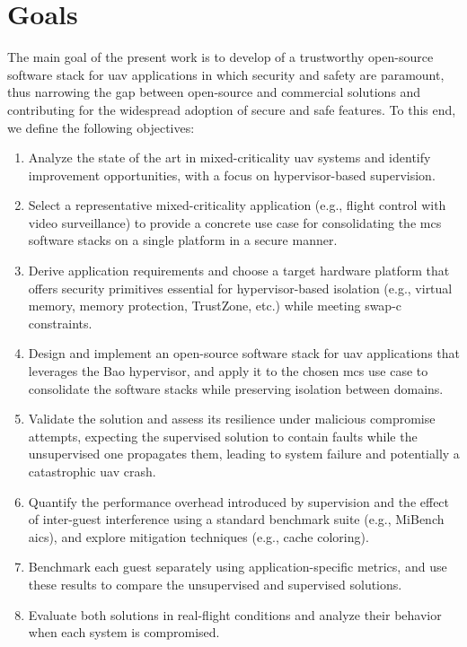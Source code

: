 \section{Goals}
The main goal of the present work is to develop of a trustworthy
open-source software stack for \gls{uav} applications in which security and
safety are paramount, thus narrowing the gap between open-source and commercial
solutions and contributing for the widespread adoption of secure and safe features.
%
To this end, we define the following objectives:
\begin{enumerate}
\item Analyze the state of the art in mixed-criticality \gls{uav} systems and
  identify improvement opportunities, with a focus on hypervisor-based
  supervision.
\item Select a representative mixed-criticality application (e.g., flight
  control with video surveillance) to provide a concrete use case for
  consolidating the \gls{mcs} software stacks on a single platform in a secure
  manner.
\item Derive application requirements and choose a target hardware platform that
  offers security primitives essential for hypervisor-based isolation (e.g.,
  virtual memory, memory protection, TrustZone, etc.) while meeting \gls{swap-c}
  constraints.
\item Design and implement an open-source software stack for \gls{uav}
  applications that leverages the Bao hypervisor, and apply it to the chosen
  \gls{mcs} use case to consolidate the software stacks while preserving
  isolation between domains.
\item Validate the solution and assess its resilience under malicious compromise
  attempts, expecting the supervised solution to contain faults while the
  unsupervised one propagates them, leading to system failure and
  potentially a catastrophic \gls{uav} crash.
\item Quantify the performance overhead introduced by supervision and the effect
  of inter-guest interference using a standard benchmark suite (e.g., MiBench
  \gls{aics}), and explore mitigation techniques (e.g., cache coloring).
\item Benchmark each guest separately using application-specific metrics, and
  use these results to compare the unsupervised and supervised solutions.
\item Evaluate both solutions in real-flight conditions and analyze their
  behavior when each system is compromised.
\end{enumerate}


